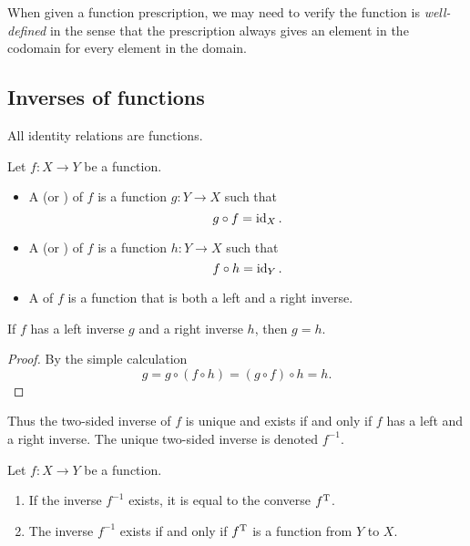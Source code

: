 When given a function prescription, we may need to verify the function is \emph{well-defined} in the sense that the prescription always gives an element in the codomain for every element in the domain.

\subsection{Inverses of functions}
All identity relations are functions.

\begin{definition}
Let $f:X\to Y$ be a function.
\begin{itemize}
\item A  (or ) of $f$ is a function $g: Y\to X$ such that
\[ g\circ f = \operatorname{id}_X. \]
\item A  (or ) of $f$ is a function $h: Y\to X$ such that
\[ f\circ h = \operatorname{id}_Y. \]
\item A  of $f$ is a function that is both a left and a right inverse.
\end{itemize}
\end{definition}

\begin{lemma} \label{lemma:leftRightInverse}
If $f$ has a left inverse $g$ and a right inverse $h$, then $g=h$.
\end{lemma}
\begin{proof}
By the simple calculation
\[ g = g\circ (f\circ h) = (g\circ f) \circ h = h. \]
\end{proof}
Thus the two-sided inverse of $f$ is unique and exists \textup{if and only if} $f$ has a left and a right inverse. The unique two-sided inverse is denoted $f^{-1}$.

\begin{lemma}
Let $f:X\to Y$ be a function.
\begin{enumerate}
\item If the inverse $f^{-1}$ exists, it is equal to the converse $f^{\mathrm{T}}$.
\item The inverse $f^{-1}$ exists \textup{if and only if} $f^{\mathrm{T}}$ is a function from $Y$ to $X$.
\end{enumerate}
\end{lemma}

